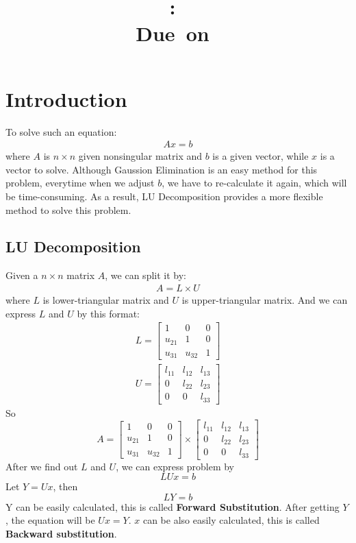 \documentclass{article}
\title{
    \vspace{2in}
    \textmd{\textbf{\hmwkClass:\ \hmwkTitle}}\\
    \normalsize\vspace{0.1in}\small{Due\ on\ \hmwkDueDate}\\
    \vspace{3in}
}
\author{\textbf{\hmwkAuthorName}}
\date{} %
\begin{document}
\maketitle
\newpage

\section{Introduction}
To solve such an equation:
\begin{gather}
    Ax = b
\end{gather}
where $A$ is $n \times n$ given nonsingular matrix and $b$ is a given vector, while $x$ is a vector to solve. Although Gaussion 
Elimination is an easy method for this problem, everytime when we adjust $b$, we have to re-calculate it again, which will be 
time-consuming. As a result, LU Decomposition provides a more flexible method to solve this problem.

\subsection{LU Decomposition}
Given a $n \times n$ matrix $A$, we can split it by:
\begin{gather}
    A = L \times U
\end{gather}
where $L$ is lower-triangular matrix and $U$ is upper-triangular matrix. And we can express $L$ and $U$ by this format:
\begin{gather}
    L = 
    \begin{bmatrix}
        1 & 0 & 0 \\
        u_{21}  & 1 & 0 \\
        u_{31}  & u_{32} & 1
    \end{bmatrix} 
\end{gather}
\begin{gather}
    U = 
    \begin{bmatrix}
        l_{11} & l_{12} & l_{13} \\
        0 & l_{22} & l_{23} \\
        0 & 0 & l_{33}
    \end{bmatrix} 
\end{gather}
So
\[
    A =
    \begin{bmatrix}
        1 & 0 & 0 \\
        u_{21}  & 1 & 0 \\
        u_{31}  & u_{32} & 1
    \end{bmatrix} 
    \times
    \begin{bmatrix}
        l_{11} & l_{12} & l_{13} \\
        0 & l_{22} & l_{23} \\
        0 & 0 & l_{33}
    \end{bmatrix} 
\]
After we find out $L$ and $U$, we can express problem by 
$$
    LUx = b
$$
Let $Y = Ux$, then
$$
    LY = b
$$
Y can be easily calculated, this is called \textbf{Forward Substitution}. After getting $Y$, the equation will be $Ux = Y$. $x$ can be
also easily calculated, this is called \textbf{Backward substitution}.
\end{document}
